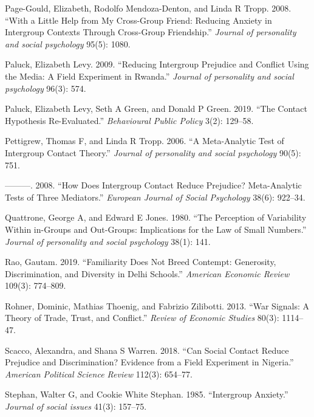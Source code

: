 \documentclass[11pt]{article}
\begin{document}
\leavevmode\hypertarget{ref-page2008little}{}%
Page-Gould, Elizabeth, Rodolfo Mendoza-Denton, and Linda R Tropp. 2008.
``With a Little Help from My Cross-Group Friend: Reducing Anxiety in
Intergroup Contexts Through Cross-Group Friendship.'' \emph{Journal of
personality and social psychology} 95(5): 1080.

\leavevmode\hypertarget{ref-paluck2009jsp}{}%
Paluck, Elizabeth Levy. 2009. ``Reducing Intergroup Prejudice and
Conflict Using the Media: A Field Experiment in Rwanda.'' \emph{Journal
of personality and social psychology} 96(3): 574.

\leavevmode\hypertarget{ref-paluck2019contact}{}%
Paluck, Elizabeth Levy, Seth A Green, and Donald P Green. 2019. ``The
Contact Hypothesis Re-Evaluated.'' \emph{Behavioural Public Policy}
3(2): 129--58.

\leavevmode\hypertarget{ref-pettigrew2006meta}{}%
Pettigrew, Thomas F, and Linda R Tropp. 2006. ``A Meta-Analytic Test of
Intergroup Contact Theory.'' \emph{Journal of personality and social
psychology} 90(5): 751.

\leavevmode\hypertarget{ref-pettigrew2008does}{}%
---------. 2008. ``How Does Intergroup Contact Reduce Prejudice?
Meta-Analytic Tests of Three Mediators.'' \emph{European Journal of
Social Psychology} 38(6): 922--34.

\leavevmode\hypertarget{ref-quattrone1980perception}{}%
Quattrone, George A, and Edward E Jones. 1980. ``The Perception of
Variability Within in-Groups and Out-Groups: Implications for the Law of
Small Numbers.'' \emph{Journal of personality and social psychology}
38(1): 141.

\leavevmode\hypertarget{ref-rao2019familiarity}{}%
Rao, Gautam. 2019. ``Familiarity Does Not Breed Contempt: Generosity,
Discrimination, and Diversity in Delhi Schools.'' \emph{American
Economic Review} 109(3): 774--809.

\leavevmode\hypertarget{ref-rohner2013war}{}%
Rohner, Dominic, Mathias Thoenig, and Fabrizio Zilibotti. 2013. ``War
Signals: A Theory of Trade, Trust, and Conflict.'' \emph{Review of
Economic Studies} 80(3): 1114--47.

\leavevmode\hypertarget{ref-scacco2018nigeria}{}%
Scacco, Alexandra, and Shana S Warren. 2018. ``Can Social Contact Reduce
Prejudice and Discrimination? Evidence from a Field Experiment in
Nigeria.'' \emph{American Political Science Review} 112(3): 654--77.

\leavevmode\hypertarget{ref-stephan1985intergroup}{}%
Stephan, Walter G, and Cookie White Stephan. 1985. ``Intergroup
Anxiety.'' \emph{Journal of social issues} 41(3): 157--75.
\end{document}
